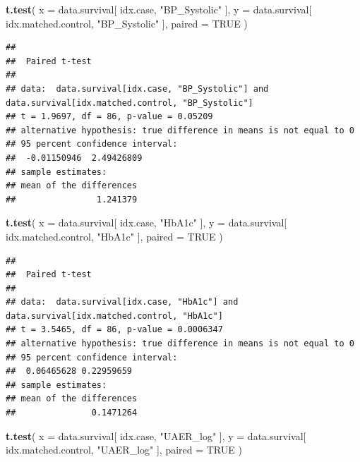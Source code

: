 \documentclass[]{article}
\newenvironment{Shaded}{\begin{snugshade}}{\end{snugshade}}
\newcommand{\DataTypeTok}[1]{\textcolor[rgb]{0.13,0.29,0.53}{#1}}
\newcommand{\KeywordTok}[1]{\textcolor[rgb]{0.13,0.29,0.53}{\textbf{#1}}}
\newcommand{\NormalTok}[1]{#1}
\newcommand{\OtherTok}[1]{\textcolor[rgb]{0.56,0.35,0.01}{#1}}
\newcommand{\StringTok}[1]{\textcolor[rgb]{0.31,0.60,0.02}{#1}}
\begin{document}
\begin{Shaded}
\begin{Highlighting}[]
\KeywordTok{t.test}\NormalTok{( }
  \DataTypeTok{x =}\NormalTok{ data.survival[ idx.case, }\StringTok{"BP_Systolic"}\NormalTok{ ],}
  \DataTypeTok{y =}\NormalTok{ data.survival[ idx.matched.control, }\StringTok{"BP_Systolic"}\NormalTok{ ],}
  \DataTypeTok{paired =} \OtherTok{TRUE}
\NormalTok{)}
\end{Highlighting}
\end{Shaded}

\begin{verbatim}
## 
##  Paired t-test
## 
## data:  data.survival[idx.case, "BP_Systolic"] and data.survival[idx.matched.control, "BP_Systolic"]
## t = 1.9697, df = 86, p-value = 0.05209
## alternative hypothesis: true difference in means is not equal to 0
## 95 percent confidence interval:
##  -0.01150946  2.49426809
## sample estimates:
## mean of the differences 
##                1.241379
\end{verbatim}

\begin{Shaded}
\begin{Highlighting}[]
\KeywordTok{t.test}\NormalTok{(}
  \DataTypeTok{x =}\NormalTok{ data.survival[ idx.case, }\StringTok{"HbA1c"}\NormalTok{ ],}
  \DataTypeTok{y =}\NormalTok{ data.survival[ idx.matched.control, }\StringTok{"HbA1c"}\NormalTok{ ],}
  \DataTypeTok{paired =} \OtherTok{TRUE}
\NormalTok{)}
\end{Highlighting}
\end{Shaded}

\begin{verbatim}
## 
##  Paired t-test
## 
## data:  data.survival[idx.case, "HbA1c"] and data.survival[idx.matched.control, "HbA1c"]
## t = 3.5465, df = 86, p-value = 0.0006347
## alternative hypothesis: true difference in means is not equal to 0
## 95 percent confidence interval:
##  0.06465628 0.22959659
## sample estimates:
## mean of the differences 
##               0.1471264
\end{verbatim}

\begin{Shaded}
\begin{Highlighting}[]
\KeywordTok{t.test}\NormalTok{( }
  \DataTypeTok{x =}\NormalTok{ data.survival[ idx.case, }\StringTok{"UAER_log"}\NormalTok{ ],}
  \DataTypeTok{y =}\NormalTok{ data.survival[ idx.matched.control, }\StringTok{"UAER_log"}\NormalTok{ ],}
  \DataTypeTok{paired =} \OtherTok{TRUE}
\NormalTok{)}
\end{Highlighting}
\end{Shaded}
\end{document}
